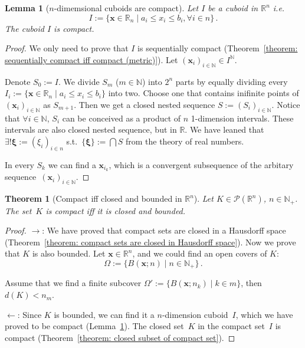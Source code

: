 \documentclass[openany]{book}
\theoremstyle{plain}
\newtheorem{theorem}{Theorem}[section] %
\newtheorem{lemma}{Lemma} %
\theoremstyle{definition}
\newcommand*{\bv}{\boldsymbol} %
\begin{document}
\begin{lemma}[$n$-dimemsional cuboids are compact]
	\label{lemma: n-dimensional cuboids are compact}
	Let $I$ be a cuboid in $\mathbb R^n$ i.e.\ 
	\begin{equation*}
		I := \{\bv x \in \mathbb R_n \mid a_i \leq x_i \leq b_i, \forall i \in n\}\,.
	\end{equation*}
	The cuboid $I$ is compact.
\end{lemma}
\begin{proof}
	We only need to prove that $I$ is sequentially compact (Theorem~\ref{theorem: sequentially compact iff compact (metric)}). 
	Let $(\bv x_i)_{i \in \mathbb N} \in I^\mathbb N$. 
	
	Denote $S_0 := I$.
	We divide $S_m$ ($m \in \mathbb N$) into $2^n$ parts by equally dividing every $I_i := \{\bv x \in \mathbb R_n \mid a_i \leq x_i \leq b_i\}$ into two. 
	Choose one that contains inifinite points of $(\bv x_i)_{i \in \mathbb N}$ as $S_{m+1}$. 
	Then we get a closed nested sequence $S := (S_i)_{i \in \mathbb N}$.
	Notice that $\forall i \in \mathbb N$, $S_i$ can be conceived as a product of $n$ 1-dimension intervals. These intervals are also closed nested sequence, but in $\mathbb R$. 
	We have leaned that $\exists! \bv \xi := (\xi_i)_{i \in n}$ s.t.\ $\{\bv \xi\} := \bigcap S$ from the theory of real numbers.

	In every $S_k$ we can find a $\bv x_{i_k}$, which is a convergent subsequence of the arbitary sequence~$(\bv x_i)_{i \in \mathbb N}$.
\end{proof}

\begin{theorem}[Compact iff closed and bounded in $\mathbb R^n$]
	\label{theorem: compact iff closed and bounded in Rn}
	Let $K \in \mathscr P(\mathbb R^n)$, $n \in \mathbb N_+$.
	The set~$K$ is compact \emph{iff} it is closed and bounded.
\end{theorem}
\begin{proof}
	$\to$: 
	We have proved that compact sets are closed in a Hausdorff space (Theorem~\ref{theorem: compact sets are closed in Hausdorff space}). 
	Now we prove that $K$ is also bounded. 
	Let $\bv x \in \mathbb R^n$, and we could find an open covers of $K$: 
	\begin{equation*}
		\varOmega := \{B(\bv x; n) \mid n \in \mathbb N_+\}\,.
	\end{equation*}

	Assume that we find a finite subcover $\varOmega' := \{B(\bv x; n_k) \mid k \in m\}$, then $d(K) < n_m$.

	$\gets$: Since $K$ is bounded, we can find it a $n$-dimension cuboid~$I$, which we have proved to be compact (Lemma~\ref{lemma: n-dimensional cuboids are compact}). 
	The closed set~$K$ in the compact set~$I$ is compact (Theorem~\ref{theorem: closed subset of compact set}).

\end{proof}
\end{document}
